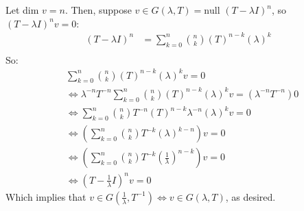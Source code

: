\documentclass{article}
\begin{document}
Let dim $v = n$. Then, suppose $v \in G(\lambda, T) = \text{null }(T-\lambda I)^{n}$, so $(T-\lambda I)^{n} v = 0$:
\begin{align*}
(T-\lambda I)^{n} &= \sum_{k=0}^{n} {n \choose k}(T)^{n-k}(\lambda)^{k}\\
\end{align*}
So:
\begin{align*}
&\sum_{k=0}^{n} {n \choose k}(T)^{n-k}(\lambda)^{k} v = 0\\
&\iff \lambda^{-n} T^{-n} \sum_{k=0}^{n} {n \choose k}(T)^{n-k}(\lambda)^{k} v = (\lambda^{-n} T^{-n}) 0\\
&\iff \sum_{k=0}^{n} {n \choose k} T^{-n} (T)^{n-k} \lambda^{-n}(\lambda)^{k} v = 0\\
&\iff (\sum_{k=0}^{n} {n \choose k} T^{-k}(\lambda)^{k-n}) v = 0\\
&\iff (\sum_{k=0}^{n} {n \choose k} T^{-k}(\frac{1}{\lambda})^{n-k}) v = 0\\
&\iff (T-\frac{1}{\lambda}I)^{n} v= 0
\end{align*}
Which implies that $v\in G(\frac{1}{\lambda}, T^{-1}) \iff v\in G(\lambda, T)$, as desired.
\end{document}
